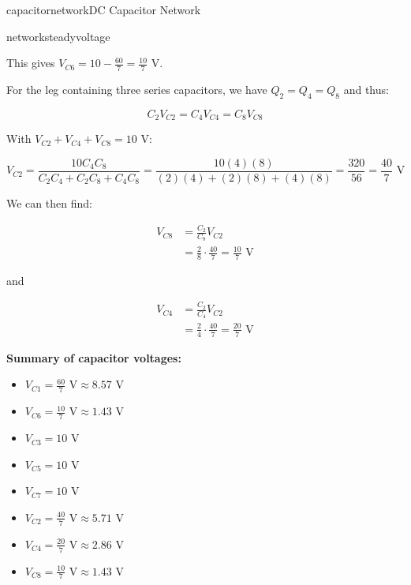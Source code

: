 \begin{mainquestion}{capacitornetwork}{DC Capacitor Network}
\begin{partquestion}{networksteadyvoltage}
\begin{answer}
This gives $V_{C6} = 10 - \frac{60}{7} = \frac{10}{7}\text{ V}$.

For the leg containing three series capacitors, we have $Q_2 = Q_4 = Q_8$ and thus:

\[
C_2 V_{C2} = C_4 V_{C4} = C_8 V_{C8}
\]

With $V_{C2} + V_{C4} + V_{C8} = 10\text{ V}$:

\[
V_{C2} = \frac{10 C_4 C_8}{C_2 C_4 + C_2 C_8 + C_4 C_8} = \frac{10(4)(8)}{(2)(4) + (2)(8) + (4)(8)} = \frac{320}{56} = \frac{40}{7}\text{ V}
\]

We can then find:

\begin{align*}
V_{C8} &= \frac{C_2}{C_8}V_{C2} \\
&= \frac{2}{8}\cdot\frac{40}{7} = \frac{10}{7}\text{ V}
\end{align*}

and

\begin{align*}
V_{C4} &= \frac{C_2}{C_4}V_{C2} \\
&= \frac{2}{4}\cdot\frac{40}{7} = \frac{20}{7}\text{ V}
\end{align*}

\textbf{Summary of capacitor voltages:}
\begin{itemize}
  \item $V_{C1} = \frac{60}{7}\text{ V} \approx 8.57\text{ V}$
  \item $V_{C6} = \frac{10}{7}\text{ V} \approx 1.43\text{ V}$
  \item $V_{C3} = 10\text{ V}$
  \item $V_{C5} = 10\text{ V}$
  \item $V_{C7} = 10\text{ V}$
  \item $V_{C2} = \frac{40}{7}\text{ V} \approx 5.71\text{ V}$ 
  \item $V_{C4} = \frac{20}{7}\text{ V} \approx 2.86\text{ V}$
  \item $V_{C8} = \frac{10}{7}\text{ V} \approx 1.43\text{ V}$
\end{itemize}

\end{answer}
\end{partquestion}

\end{mainquestion}
